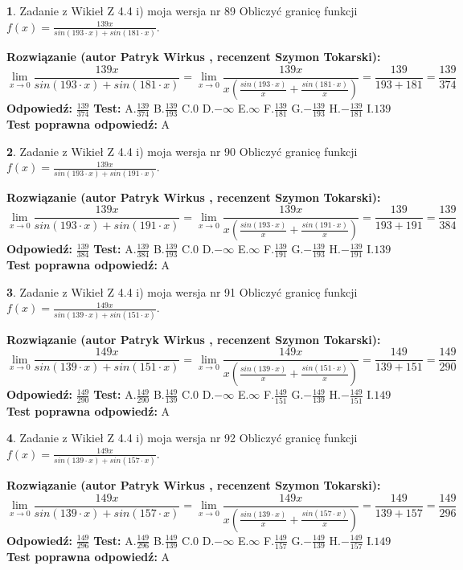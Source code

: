 \documentclass[12pt, a4paper]{article}
\theoremstyle{definition} %
\newtheorem{zad}{}
\newcommand{\zadStart}[1]{\begin{zad}#1\newline}
\newcommand{\zadStop}{\end{zad}}
\newcommand{\rozwStart}[2]{\noindent \textbf{Rozwiązanie (autor #1 , recenzent #2): }\newline}
\newcommand{\rozwStop}{\newline}
\newcommand{\odpStart}{\noindent \textbf{Odpowiedź:}\newline}
\newcommand{\odpStop}{\newline}
\newcommand{\testStart}{\noindent \textbf{Test:}\newline}
\newcommand{\testStop}{\newline}
\newcommand{\kluczStart}{\noindent \textbf{Test poprawna odpowiedź:}\newline}
\newcommand{\kluczStop}{\newline}
\begin{document}
\zadStart{Zadanie z Wikieł Z 4.4 i) moja wersja nr 89}
Obliczyć granicę funkcji $f(x)=\frac{139x}{sin(193\cdot x) +sin(181\cdot x)}$.
\zadStop
\rozwStart{Patryk Wirkus}{Szymon Tokarski}
$$\lim\limits_{x\to 0}\frac{139x}{sin(193\cdot x) +sin(181\cdot x)}=\lim\limits_{x\to 0}\frac{139x}{x(\frac{sin(193\cdot x)}{x}+\frac{sin(181\cdot x)}{x})}=\frac{139}{193+181} = \frac{139}{374}$$
\rozwStop
\odpStart
$\frac{139}{374}$
\odpStop
\testStart
A.$\frac{139}{374}$
B.$\frac{139}{193}$
C.$0$
D.$-\infty$
E.$\infty$
F.$\frac{139}{181}$
G.$-\frac{139}{193}$
H.$-\frac{139}{181}$
I.$139$
\testStop
\kluczStart
A
\kluczStop



\zadStart{Zadanie z Wikieł Z 4.4 i) moja wersja nr 90}
Obliczyć granicę funkcji $f(x)=\frac{139x}{sin(193\cdot x) +sin(191\cdot x)}$.
\zadStop
\rozwStart{Patryk Wirkus}{Szymon Tokarski}
$$\lim\limits_{x\to 0}\frac{139x}{sin(193\cdot x) +sin(191\cdot x)}=\lim\limits_{x\to 0}\frac{139x}{x(\frac{sin(193\cdot x)}{x}+\frac{sin(191\cdot x)}{x})}=\frac{139}{193+191} = \frac{139}{384}$$
\rozwStop
\odpStart
$\frac{139}{384}$
\odpStop
\testStart
A.$\frac{139}{384}$
B.$\frac{139}{193}$
C.$0$
D.$-\infty$
E.$\infty$
F.$\frac{139}{191}$
G.$-\frac{139}{193}$
H.$-\frac{139}{191}$
I.$139$
\testStop
\kluczStart
A
\kluczStop



\zadStart{Zadanie z Wikieł Z 4.4 i) moja wersja nr 91}
Obliczyć granicę funkcji $f(x)=\frac{149x}{sin(139\cdot x) +sin(151\cdot x)}$.
\zadStop
\rozwStart{Patryk Wirkus}{Szymon Tokarski}
$$\lim\limits_{x\to 0}\frac{149x}{sin(139\cdot x) +sin(151\cdot x)}=\lim\limits_{x\to 0}\frac{149x}{x(\frac{sin(139\cdot x)}{x}+\frac{sin(151\cdot x)}{x})}=\frac{149}{139+151} = \frac{149}{290}$$
\rozwStop
\odpStart
$\frac{149}{290}$
\odpStop
\testStart
A.$\frac{149}{290}$
B.$\frac{149}{139}$
C.$0$
D.$-\infty$
E.$\infty$
F.$\frac{149}{151}$
G.$-\frac{149}{139}$
H.$-\frac{149}{151}$
I.$149$
\testStop
\kluczStart
A
\kluczStop



\zadStart{Zadanie z Wikieł Z 4.4 i) moja wersja nr 92}
Obliczyć granicę funkcji $f(x)=\frac{149x}{sin(139\cdot x) +sin(157\cdot x)}$.
\zadStop
\rozwStart{Patryk Wirkus}{Szymon Tokarski}
$$\lim\limits_{x\to 0}\frac{149x}{sin(139\cdot x) +sin(157\cdot x)}=\lim\limits_{x\to 0}\frac{149x}{x(\frac{sin(139\cdot x)}{x}+\frac{sin(157\cdot x)}{x})}=\frac{149}{139+157} = \frac{149}{296}$$
\rozwStop
\odpStart
$\frac{149}{296}$
\odpStop
\testStart
A.$\frac{149}{296}$
B.$\frac{149}{139}$
C.$0$
D.$-\infty$
E.$\infty$
F.$\frac{149}{157}$
G.$-\frac{149}{139}$
H.$-\frac{149}{157}$
I.$149$
\testStop
\kluczStart
A
\kluczStop
\end{document}
